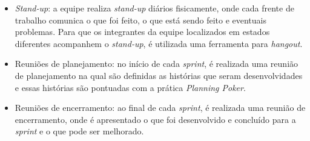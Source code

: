 \begin{itemize}
 \item \textit{Stand-up}: a equipe realiza \textit{stand-up} diários fisicamente, onde cada frente de trabalho comunica o que foi feito, o que está sendo feito e eventuais problemas. Para que os integrantes da equipe localizados em estados diferentes acompanhem o \textit{stand-up}, é utilizada uma ferramenta para \textit{hangout}.
 \item Reuniões de planejamento: no início de cada \textit{sprint}, é realizada uma reunião de planejamento na qual são definidas as histórias que seram desenvolvidades e essas histórias são pontuadas com a prática \textit{Planning Poker}.
 \item Reuniões de encerramento: ao final de cada \textit{sprint}, é realizada uma reunião de encerramento, onde é apresentado o que foi desenvolvido e concluído para a \textit{sprint} e o que pode ser melhorado.
\end{itemize}


